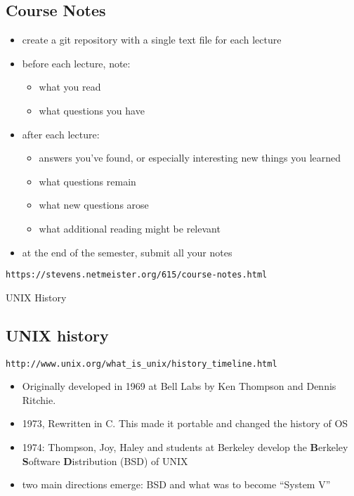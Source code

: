 \documentclass[xga]{xdvislides}
\begin{document}
\subsection{Course Notes}
\begin{itemize}
	\item create a git repository with a single text file for each lecture
	\item before each lecture, note:
		\begin{itemize}
			\item what you read
			\item what questions you have
		\end{itemize}
	\item after each lecture:
		\begin{itemize}
			\item answers you've found, or especially interesting new things you learned
			\item what questions remain
			\item what new questions arose
			\item what additional reading might be relevant
		\end{itemize}
	\item at the end of the semester, submit all your notes
\end{itemize}

\verb+https://stevens.netmeister.org/615/course-notes.html+

\pagebreak

\vspace*{\fill}
\begin{center}
  \Hugesize
    UNIX History
	\hspace*{5mm}\blueline\\ [1em]
  \Normalsize
\end{center}
\vspace*{\fill}

\subsection{UNIX history}
\verb+http://www.unix.org/what_is_unix/history_timeline.html+ \\

\begin{itemize}
	\item Originally developed in 1969 at Bell Labs by Ken Thompson
		and Dennis Ritchie.
	\item 1973, Rewritten in C. This made it portable and changed the history of OS
	\item 1974: Thompson, Joy, Haley and students at Berkeley develop
		the {\bf B}erkeley {\bf S}oftware {\bf D}istribution (BSD) of UNIX
	\item two main directions emerge: BSD and what was to become ``System V''
\end{itemize}
\end{document}
